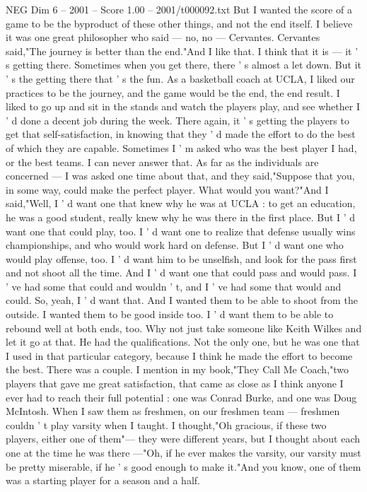 \begin{textsample}{NEG Dim 6 – 2001 – Score 1.00 – 2001/t000092.txt}
But I wanted the score of a game to be the byproduct of these other things, and not the end itself.
I believe it was one great philosopher who said — no, no — Cervantes.
Cervantes said,"The journey is better than the end."And I like that.
I think that it is — it ' s getting there.
Sometimes when you get there, there ' s almost a let down.
But it ' s the getting there that ' s the fun.
As a basketball coach at UCLA, I liked our practices to be the journey, and the game would be the end, the end result.
I liked to go up and sit in the stands and watch the players play, and see whether I ' d done a decent job during the week.
There again, it ' s getting the players to get that self-satisfaction, in knowing that they ' d made the effort to do the best of which they are capable.
Sometimes I ' m asked who was the best player I had, or the best teams.
I can never answer that.
As far as the individuals are concerned — I was asked one time about that, and they said,"Suppose that you, in some way, could make the perfect player.
What would you want?"And I said,"Well, I ' d want one that knew why he was at UCLA : to get an education, he was a good student, really knew why he was there in the first place.
But I ' d want one that could play, too.
I ' d want one to realize that defense usually wins championships, and who would work hard on defense.
But I ' d want one who would play offense, too.
I ' d want him to be unselfish, and look for the pass first and not shoot all the time.
And I ' d want one that could pass and would pass.
I ' ve had some that could and wouldn ' t, and I ' ve had some that would and could.
So, yeah, I ' d want that.
And I wanted them to be able to shoot from the outside.
I wanted them to be good inside too.
I ' d want them to be able to rebound well at both ends, too.
Why not just take someone like Keith Wilkes and let it go at that.
He had the qualifications.
Not the only one, but he was one that I used in that particular category, because I think he made the effort to become the best.
There was a couple.
I mention in my book,"They Call Me Coach,"two players that gave me great satisfaction, that came as close as I think anyone I ever had to reach their full potential : one was Conrad Burke, and one was Doug McIntosh.
When I saw them as freshmen, on our freshmen team — freshmen couldn ' t play varsity when I taught.
I thought,"Oh gracious, if these two players, either one of them"— they were different years, but I thought about each one at the time he was there —"Oh, if he ever makes the varsity, our varsity must be pretty miserable, if he ' s good enough to make it."And you know, one of them was a starting player for a season and a half.

\end{textsample}
